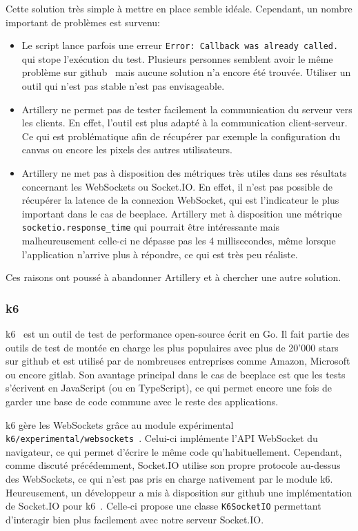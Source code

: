 Cette solution très simple à mettre en place semble idéale. Cependant, un nombre important de problèmes est survenu:

\begin{itemize}
  \item Le script lance parfois une erreur \texttt{Error: Callback was already called.} qui stope l'exécution du test. Plusieurs personnes semblent avoir le même problème sur \gls{github}~\cite{artillery-callback-issue} mais aucune solution n'a encore été trouvée. Utiliser un outil qui n'est pas stable n'est pas envisageable.
  \item Artillery ne permet pas de tester facilement la communication du serveur vers les clients. En effet, l'outil est plus adapté à la communication client-serveur. Ce qui est problématique afin de récupérer par exemple la configuration du canvas ou encore les pixels des autres utilisateurs.
  \item Artillery ne met pas à disposition des métriques très utiles dans ses résultats concernant les WebSockets ou Socket.IO. En effet, il n'est pas possible de récupérer la latence de la connexion WebSocket, qui est l'indicateur le plus important dans le cas de \gls{beeplace}. Artillery met à disposition une métrique \texttt{socketio.response_time} qui pourrait être intéressante mais malheureusement celle-ci ne dépasse pas les 4 millisecondes, même lorsque l'application n'arrive plus à répondre, ce qui est très peu réaliste.
\end{itemize}

Ces raisons ont poussé à abandonner Artillery et à chercher une autre solution.

\subsubsection{k6}

k6~\cite{k6} est un outil de test de performance open-source écrit en Go. Il fait partie des outils de test de montée en charge les plus populaires avec plus de 20'000 stars sur \gls{github} et est utilisé par de nombreuses entreprises comme Amazon, Microsoft ou encore \gls{gitlab}. Son avantage principal dans le cas de \gls{beeplace} est que les tests s'écrivent en JavaScript (ou en TypeScript), ce qui permet encore une fois de garder une base de code commune avec le reste des applications.

k6 gère les WebSockets grâce au module expérimental \texttt{k6/experimental/websockets}~\cite{k6-websockets}. Celui-ci implémente l'API WebSocket du navigateur, ce qui permet d'écrire le même code qu'habituellement. Cependant, comme discuté précédemment, Socket.IO utilise son propre protocole au-dessus des WebSockets, ce qui n'est pas pris en charge nativement par le module k6. Heureusement, un développeur a mis à disposition sur \gls{github} une implémentation de Socket.IO pour k6~\cite{k6-socket-io}. Celle-ci propose une classe \texttt{K6SocketIO} permettant d'interagir bien plus facilement avec notre serveur Socket.IO.

